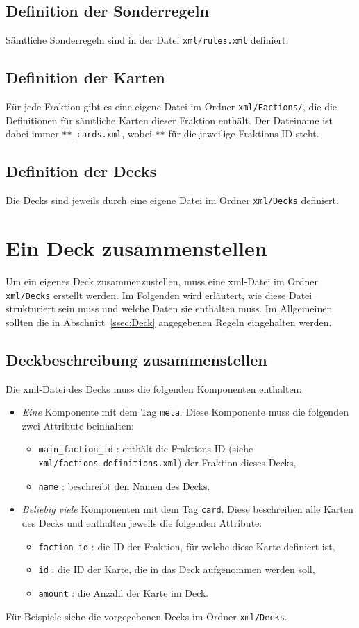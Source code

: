 \documentclass[a4paper,11pt]{report}
\newcommand{\sref}[1]{Abschnitt~\ref{#1}}
\begin{document}
\subsection{Definition der Sonderregeln}
Sämtliche Sonderregeln sind in der Datei \verb+xml/rules.xml+ definiert.

\subsection{Definition der Karten}
Für jede Fraktion gibt es eine eigene Datei im Ordner \verb+xml/Factions/+, die die Definitionen für sämtliche Karten dieser Fraktion enthält. Der Dateiname ist dabei immer \verb+**_cards.xml+, wobei \verb+**+ für die jeweilige Fraktions-ID steht.

\subsection{Definition der Decks}
Die Decks sind jeweils durch eine eigene Datei im Ordner \verb+xml/Decks+ definiert.

\section{Ein Deck zusammenstellen}
Um ein eigenes Deck zusammenzustellen, muss eine xml-Datei im Ordner \verb+xml/Decks+ erstellt werden. Im Folgenden wird erläutert, wie diese Datei strukturiert sein muss und welche Daten sie enthalten muss. Im Allgemeinen sollten die in \sref{ssec:Deck} angegebenen Regeln eingehalten werden.

\subsection{Deckbeschreibung zusammenstellen}
Die xml-Datei des Decks muss die folgenden Komponenten enthalten:
\begin{itemize}
	\item \emph{Eine} Komponente mit dem Tag \verb+meta+. Diese Komponente muss die folgenden zwei Attribute beinhalten:
	\begin{itemize}
		\item \verb+main_faction_id+ : enthält die Fraktions-ID (siehe \verb+xml/factions_definitions.xml+) der Fraktion dieses Decks,
		\item \verb+name+ : beschreibt den Namen des Decks.
	\end{itemize}
	\item \emph{Beliebig viele} Komponenten mit dem Tag \verb+card+. Diese beschreiben alle Karten des Decks und enthalten jeweils die folgenden Attribute:
	\begin{itemize}
		\item \verb+faction_id+ : die ID der Fraktion, für welche diese Karte definiert ist,
		\item \verb+id+ : die ID der Karte, die in das Deck aufgenommen werden soll,
		\item \verb+amount+ : die Anzahl der Karte im Deck.
	\end{itemize}
\end{itemize}
Für Beispiele siehe die vorgegebenen Decks im Ordner \verb+xml/Decks+.
\end{document}
